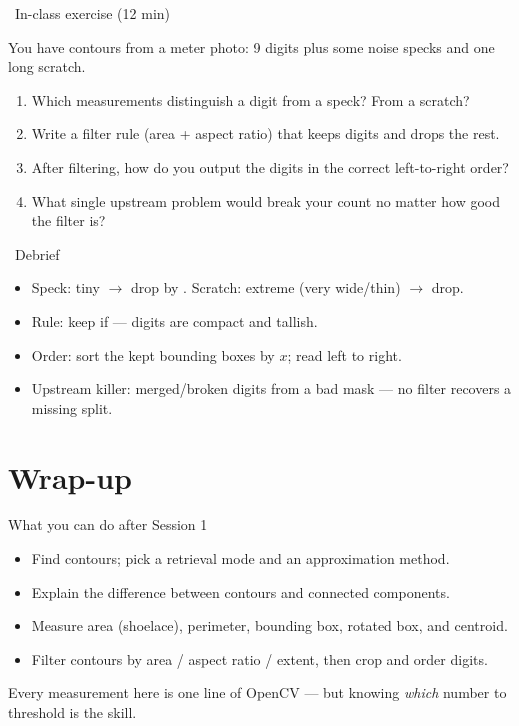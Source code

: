 \documentclass[10pt,aspectratio=169]{beamer}
\begin{document}
\begin{frame}{\faPen~In-class exercise (12 min)}
  \begin{infobox}
    You have contours from a meter photo: 9 digits plus some noise specks and one long scratch.
  \end{infobox}
  \begin{enumerate}
    \item Which measurements distinguish a digit from a speck? From a scratch?
    \item Write a filter rule (area + aspect ratio) that keeps digits and drops the rest.
    \item After filtering, how do you output the digits in the correct left-to-right order?
    \item What single upstream problem would break your count no matter how good the filter is?
  \end{enumerate}
\end{frame}

\begin{frame}{\faPen~Debrief}
  \begin{itemize}
    \item Speck: tiny  $\rightarrow$ drop by . Scratch: extreme  (very wide/thin) $\rightarrow$ drop.
    \item Rule: keep if  — digits are compact and tallish.
    \item Order: sort the kept bounding boxes by $x$; read left to right.
    \item Upstream killer: merged/broken digits from a bad mask — no filter recovers a missing split.
  \end{itemize}
\end{frame}

\section{Wrap-up}

\begin{frame}{What you can do after Session 1}
  \begin{itemize}
    \item Find contours; pick a retrieval mode and an approximation method.
    \item Explain the difference between contours and connected components.
    \item Measure area (shoelace), perimeter, bounding box, rotated box, and centroid.
    \item Filter contours by area / aspect ratio / extent, then crop and order digits.
  \end{itemize}
  \begin{goodbox}
    Every measurement here is one line of OpenCV — but knowing \emph{which} number to threshold is the skill.
  \end{goodbox}
\end{frame}
\end{document}
